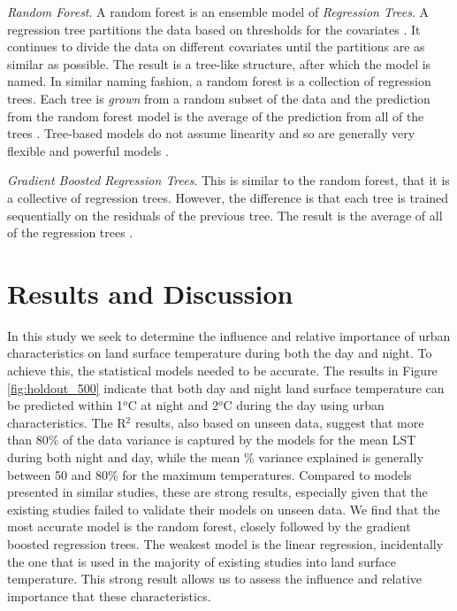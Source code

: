 \documentclass[final,3p,times,twocolumn,sort&compress]{elsarticle}
\begin{document}
\textit{Random Forest}. A random forest is an ensemble model of \textit{Regression Trees}. 
A regression tree partitions the data based on thresholds for the covariates \cite{Breiman1984-hw}. It continues to divide the data on different covariates until the partitions are as similar as possible. 
The result is a tree-like structure, after which the model is named.
In similar naming fashion, a random forest is a collection of regression trees.
Each tree is \textit{grown} from a random subset of the data and the prediction from the random forest model is the average of the prediction from all of the trees \cite{Breiman2001-rt}.
Tree-based models do not assume linearity and so are generally very flexible and powerful models \cite{Breiman2001-rt, Geron2017-ek}.

\textit{Gradient Boosted Regression Trees}. This is similar to the random forest, that it is a collective of regression trees. 
However, the difference is that each tree is trained sequentially on the residuals of the previous tree.
The result is the average of all of the regression trees \cite{Geron2017-ek}.

\section{Results and Discussion}
In this study we seek to determine the influence and relative importance of urban characteristics on land surface temperature during both the day and night.
To achieve this, the statistical models needed to be accurate.
The results in Figure \ref{fig:holdout_500} indicate that both day and night land surface temperature can be predicted within 1$^o$C at night and 2$^o$C during the day using urban characteristics.
The R$^2$ results, also based on unseen data, suggest that more than 80\% of the data variance is captured by the models for the mean LST during both night and day, while the mean \% variance explained is generally between 50 and 80\% for the maximum temperatures.
Compared to models presented in similar studies, these are strong results, especially given that the existing studies failed to validate their models on unseen data.
We find that the most accurate model is the random forest, closely followed by the gradient boosted regression trees.
The weakest model is the linear regression, incidentally the one that is used in the majority of existing studies into land surface temperature.
This strong result allows us to assess the influence and relative importance that these characteristics.
\end{document}
